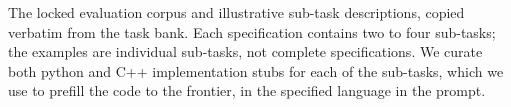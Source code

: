 \begin{table}[ht]\centering\small

\caption{The locked evaluation corpus and illustrative sub-task descriptions, copied verbatim from the task bank. Each specification contains two to four sub-tasks; the examples are individual sub-tasks, not complete specifications. We curate both python and C++ implementation stubs for each of the sub-tasks, which we use to prefill the code to the frontier, in the specified language in the prompt.}
\label{tab:data-distribution}
\end{table}




